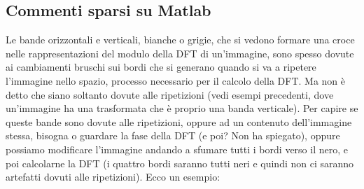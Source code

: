 \documentclass[a4paper,11pt]{article}
\begin{document}
\subsection{Commenti sparsi su Matlab}
Le bande orizzontali e verticali, bianche o grigie, che si vedono formare una croce nelle rappresentazioni del modulo della DFT di
un'immagine, sono spesso dovute ai cambiamenti bruschi sui bordi che si generano quando si va a ripetere l'immagine nello spazio,
processo necessario per il calcolo della DFT. Ma non è detto che siano soltanto dovute alle ripetizioni (vedi esempi precedenti, dove un'immagine ha una
trasformata che è proprio una banda verticale). Per capire se queste bande sono dovute alle ripetizioni, oppure ad un contenuto dell'immagine stessa, bisogna
o guardare la fase della DFT (e poi? Non ha spiegato), oppure possiamo modificare l'immagine andando a sfumare tutti i bordi
verso il nero, e poi calcolarne la DFT (i quattro bordi saranno tutti neri e quindi non ci saranno artefatti dovuti alle ripetizioni). Ecco un esempio:
\end{document}

